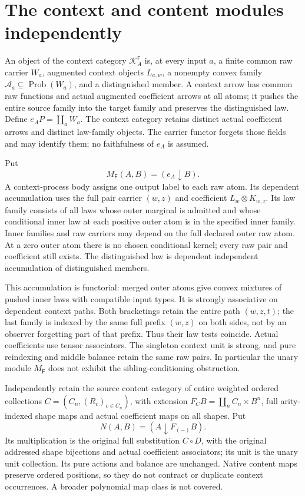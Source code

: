 \documentclass[11pt]{article}
\begin{document}
\section{The context and content modules independently}
An object of the context category $\mathcal K_A^{\mathsf F}$ is, at every input $a$, a finite common raw carrier $W_a$, augmented context objects $L_{a,w}$, a nonempty convex family $\mathcal A_a\subseteq\operatorname{Prob}(W_a)$, and a distinguished member. A context arrow has common raw functions and actual augmented coefficient arrows at all atoms; it pushes the entire source family into the target family and preserves the distinguished law. Define $e_AP=\coprod_aW_a$. The context category retains distinct actual coefficient arrows and distinct law-family objects. The carrier functor forgets those fields and may identify them; no faithfulness of $e_A$ is assumed.

Put
\[
 M_{\mathsf F}(A,B)=(e_A\downarrow B).
\]
A context-process body assigns one output label to each raw atom. Its dependent accumulation uses the full pair carrier $(w,z)$ and coefficient $L_w\otimes K_{w,z}$. Its law family consists of all laws whose outer marginal is admitted and whose conditional inner law at each positive outer atom is in the specified inner family. Inner families and raw carriers may depend on the full declared outer raw atom. At a zero outer atom there is no chosen conditional kernel; every raw pair and coefficient still exists. The distinguished law is dependent independent accumulation of distinguished members.

This accumulation is functorial: merged outer atoms give convex mixtures of pushed inner laws with compatible input types. It is strongly associative on dependent context paths. Both bracketings retain the entire path $(w,z,t)$; the last family is indexed by the same full prefix $(w,z)$ on both sides, not by an observer forgetting part of that prefix. Thus their law tests coincide. Actual coefficients use tensor associators. The singleton context unit is strong, and pure reindexing and middle balance retain the same raw pairs. In particular the unary module $M_{\mathsf F}$ does not exhibit the sibling-conditioning obstruction.

Independently retain the source content category of entire weighted ordered collections $C=(C_n,(R_c)_{c\in C_n})$, with extension $F_CB=\coprod_nC_n\times B^n$, full arity-indexed shape maps and actual coefficient maps on all shapes. Put
\[
 N(A,B)=(A\downarrow F_{(-)}B).
\]
Its multiplication is the original full substitution $C\circ D$, with the original addressed shape bijections and actual coefficient associators; its unit is the unary unit collection. Its pure actions and balance are unchanged. Native content maps preserve ordered positions, so they do not contract or duplicate context occurrences. A broader polynomial map class is not covered.
\end{document}
